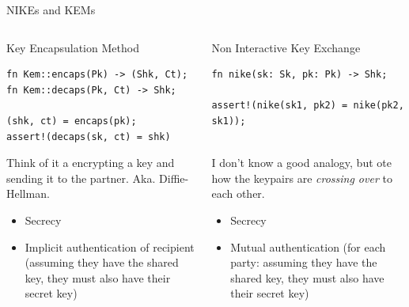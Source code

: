 \begin{frame}[fragile,t]{NIKEs and KEMs}
\hypertarget{nike-kem-2}{}
  \vspace{-1.5em}
  \begin{columns}[t]
    \begin{column}{.5\linewidth}
      \begin{block}{Key Encapsulation Method}

        \small
        \begin{verbatim}
fn Kem::encaps(Pk) -> (Shk, Ct);
fn Kem::decaps(Pk, Ct) -> Shk;

(shk, ct) = encaps(pk);
assert!(decaps(sk, ct) = shk)
        \end{verbatim}  
        \vspace{1em}
        Think of it a encrypting a key and sending it
        to the partner. Aka. Diffie-Hellman.

        \vspace{0.7em}
        \begin{itemize}
          \item Secrecy
          \item Implicit authentication of recipient
            (assuming they have the shared key, they must
            also have their secret key)
        \end{itemize}
      \end{block}
    \end{column}

    \begin{column}{.5\linewidth}
      \begin{block}{Non Interactive Key Exchange}
        \small
        \begin{verbatim}
fn nike(sk: Sk, pk: Pk) -> Shk;

assert!(nike(sk1, pk2) = nike(pk2, sk1));


        \end{verbatim}  

        \vspace{1em}
        I don't know a good analogy, but ote how the
        keypairs are \emph{crossing over} to each other.

        \vspace{0.7em}
        \begin{itemize}
          \item Secrecy
          \item Mutual authentication
            (for each party: assuming they have the shared key, they must
            also have their secret key)
        \end{itemize}
      \end{block}
    \end{column}

  \end{columns}
\end{frame}




